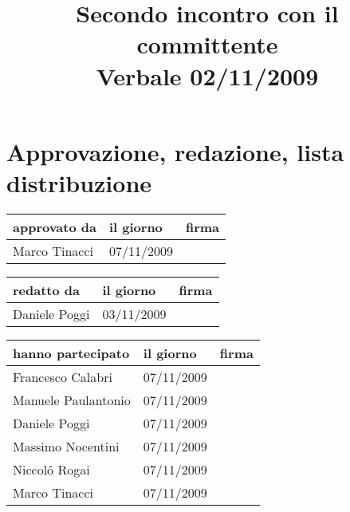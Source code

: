 \documentclass[a4paper, 12pt]{report}
\title{Secondo incontro con il committente\\Verbale 02/11/2009}
\date{ \\Firenze \\\begin{figure}[h] \centering \texttt{[image: ../../../../images/logokiwi.png]} \end{figure} }
\begin{document}
\maketitle

\newpage

\section*{Approvazione, redazione, lista distribuzione}
\begin{table}[h!]
  \begin{center}
    \begin{tabular}{| l | l | p{60mm} |}
    \hline
    \textbf{approvato da} & \textbf{il giorno} & \textbf{firma} \\
	\hline    
	Marco Tinacci & 07/11/2009 &  \\
    \hline
    \end{tabular}
  \end{center}
\end{table}

\begin{table}[h!]
  \begin{center}
    \begin{tabular}{| l | l | p{60mm} |}
    \hline
    \textbf{redatto da} & \textbf{il giorno} & \textbf{firma} \\
	\hline    
	Daniele Poggi & 03/11/2009 &  \\
    \hline
    \end{tabular}
  \end{center}
\end{table}

\begin{table}[h!]
  \begin{center}
    \begin{tabular}{| l | l | p{60mm} |}
    \hline
    \textbf{hanno partecipato} & \textbf{il giorno} & \textbf{firma} \\
	\hline    
	Francesco Calabri & 07/11/2009 &  \\
    \hline
	Manuele Paulantonio & 07/11/2009 &  \\
    \hline
	Daniele Poggi & 07/11/2009 &  \\
    \hline
	Massimo Nocentini & 07/11/2009 &  \\
    \hline
	Niccol\'o Rogai & 07/11/2009 &  \\
    \hline
	Marco Tinacci & 07/11/2009 &  \\
    \hline
    \end{tabular}
  \end{center}
\end{table}

\newpage


\end{document}
